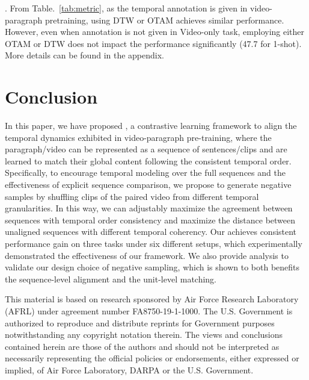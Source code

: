 . From Table.~\ref{tab:metric}, as the temporal annotation is given in video-paragraph pretraining, using DTW or OTAM achieves similar performance. However, even when annotation is not given in Video-only task, employing either OTAM or DTW does not impact the performance significantly (47.7 for 1-shot). More details can be found in the appendix.

\section{Conclusion}
In this paper, we have proposed \approach{}, a contrastive learning framework to align the temporal dynamics exhibited in video-paragraph pre-training, where the paragraph/video can be represented as a sequence of sentences/clips and are learned to match their global content following the consistent temporal order. Specifically, to encourage temporal modeling over the full sequences and the effectiveness of explicit sequence comparison, we propose to generate negative samples by shuffling clips of the paired video from different temporal granularities. In this way, we can adjustably maximize the agreement between sequences with temporal order consistency and maximize the distance between unaligned sequences with different temporal coherency. Our \approach{} achieves consistent performance gain on three tasks under six different setups, which experimentally demonstrated the effectiveness of our framework. We also provide analysis to validate our design choice of negative sampling, which is shown to both benefits the sequence-level alignment and the unit-level matching.

\noindent This material is based on research sponsored by Air Force Research Laboratory (AFRL) under agreement number FA8750-19-1-1000. 
The U.S. Government is authorized to reproduce and distribute reprints for Government purposes notwithstanding any copyright notation therein. 
The views and conclusions contained herein are those of the authors and should not be interpreted as necessarily representing the official policies or endorsements, either expressed or implied, of Air Force Laboratory, DARPA or the U.S. Government.

\newpage

